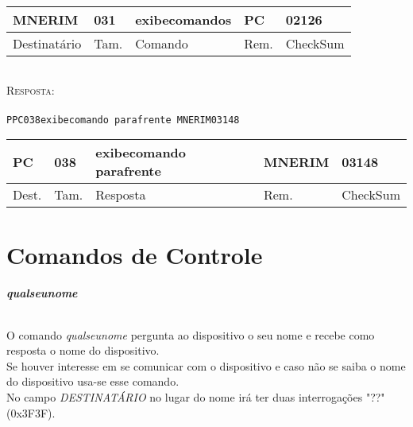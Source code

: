 \documentclass[11pt,	 papera4]{article}
\begin{document}
\begin{table}[h]
	\centering
	\begin{tabular}{p{2cm}p{1cm}p{3cm}p{1cm}p{2cm}}
		\toprule
		MNERIM & 031 & exibecomandos & PC & 02126 \\
		\midrule	
		Destinatário & Tam. & Comando & Rem. &CheckSum \\
		\bottomrule
	\end{tabular}
	\label{tab:formatoslatex} %
\end{table}
\paragraph*{\newline\newline}
\hspace*{0.8cm}\textsc{Resposta:} \\\\ \hspace*{2cm}\texttt{PPC038exibecomando parafrente MNERIM03148} 

\begin{table}[h]
	\centering
	\begin{tabular}{p{1cm}p{1cm}p{3cm}p{2cm}p{2cm}}
		\toprule
		PC & 038 & exibecomando parafrente  & MNERIM & 03148 \\
		\midrule	
		Dest. & Tam. & Resposta & Rem. & CheckSum \\
		\bottomrule
	\end{tabular}
	\label{tab:formatoslatex} %
\end{table}

\newpage

\part*{Comandos de Controle \newline}
	

\paragraph{\textbf{qualseunome} \newline \newline}
O comando \textit{qualseunome} pergunta ao dispositivo o seu nome e recebe como resposta o nome do dispositivo. \\
Se houver interesse em se comunicar com o dispositivo e
caso não se saiba o nome do dispositivo usa-se esse comando. \\
No campo \textit{DESTINATÁRIO} no lugar do nome irá ter duas interrogações "??" (0x3F3F).
\\
\end{document}
